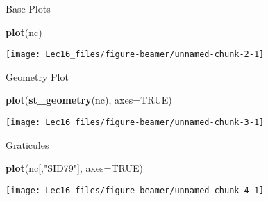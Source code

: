 \documentclass[11pt,ignorenonframetext,]{beamer}
\newenvironment{Shaded}{}{}
\newcommand{\DataTypeTok}[1]{\textcolor[rgb]{0.56,0.13,0.00}{#1}}
\newcommand{\KeywordTok}[1]{\textcolor[rgb]{0.00,0.44,0.13}{\textbf{#1}}}
\newcommand{\NormalTok}[1]{#1}
\newcommand{\OtherTok}[1]{\textcolor[rgb]{0.00,0.44,0.13}{#1}}
\newcommand{\StringTok}[1]{\textcolor[rgb]{0.25,0.44,0.63}{#1}}
\let\oldShaded\Shaded
\let\endoldShaded\endShaded
\renewenvironment{Shaded}{\footnotesize\begin{spacing}{0.9}\oldShaded}{\endoldShaded\end{spacing}}
\let\oldverbatim\verbatim
\let\endoldverbatim\endverbatim
\newcommand{\scriptoutput}{
  \renewenvironment{Shaded}{\scriptsize\begin{spacing}{0.9}\oldShaded}{\endoldShaded\end{spacing}}
  \renewenvironment{verbatim}{\scriptsize\begin{spacing}{0.9}\oldverbatim}{\endoldverbatim\end{spacing}}
}
\begin{document}
\begin{frame}[fragile,t]{Base Plots}
\protect\hypertarget{base-plots}{}

\scriptoutput

\begin{Shaded}
\begin{Highlighting}[]
\KeywordTok{plot}\NormalTok{(nc)}
\end{Highlighting}
\end{Shaded}

\begin{center}\texttt{[image: Lec16\_files/figure-beamer/unnamed-chunk-2-1]} \end{center}

\end{frame}

\begin{frame}[fragile,t]{Geometry Plot}
\protect\hypertarget{geometry-plot}{}

\scriptoutput

\begin{Shaded}
\begin{Highlighting}[]
\KeywordTok{plot}\NormalTok{(}\KeywordTok{st_geometry}\NormalTok{(nc), }\DataTypeTok{axes=}\OtherTok{TRUE}\NormalTok{)}
\end{Highlighting}
\end{Shaded}

\begin{center}\texttt{[image: Lec16\_files/figure-beamer/unnamed-chunk-3-1]} \end{center}

\end{frame}

\begin{frame}[fragile,t]{Graticules}
\protect\hypertarget{graticules}{}

\scriptoutput

\begin{Shaded}
\begin{Highlighting}[]
\KeywordTok{plot}\NormalTok{(nc[,}\StringTok{"SID79"}\NormalTok{], }\DataTypeTok{axes=}\OtherTok{TRUE}\NormalTok{)}
\end{Highlighting}
\end{Shaded}

\begin{center}\texttt{[image: Lec16\_files/figure-beamer/unnamed-chunk-4-1]} \end{center}

\end{frame}
\end{document}
